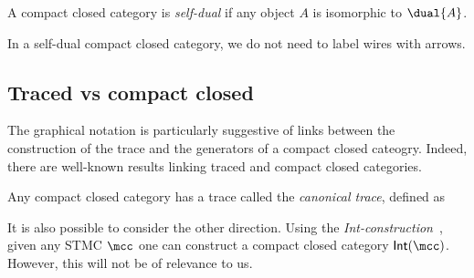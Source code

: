 \begin{definition}
    A compact closed category is \emph{self-dual} if any object \(A\) is
    isomorphic to \(\dual{A}\).
\end{definition}

In a self-dual compact closed category, we do not need to label wires with
arrows.

\subsection{Traced vs compact closed}

The graphical notation is particularly suggestive of links between the
construction of the trace and the generators of a compact closed cateogry.
Indeed, there are well-known results linking traced and compact closed
categories.

\begin{proposition}
    \label{prop:canonical-trace}
    Any compact closed category has a trace called the \emph{canonical trace},
    defined as
\end{proposition}

\begin{remark}
    It is also possible to consider the other direction.
    Using the \emph{Int-construction}~\cite{joyal1996traced}, given any STMC
    \(\mcc\) one can construct a compact closed category \(\mathsf{Int}(\mcc)\).
    However, this will not be of relevance to us.
\end{remark}